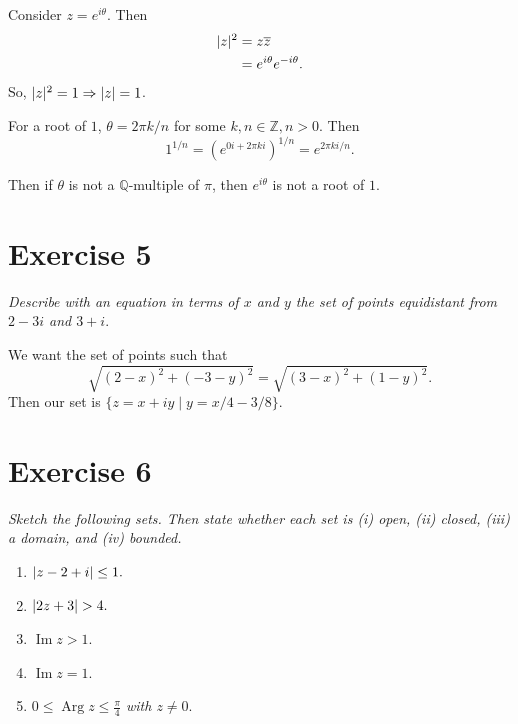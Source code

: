 \documentclass{tufte-handout}
\DeclarePairedDelimiter\abs{\lvert}{\rvert}%
\renewcommand\Im{\operatorname{Im}}
\newcommand\Arg{\operatorname{Arg}}
\begin{document}
\bigskip

Consider $z = e^{i \theta}$. Then
\begin{align*}
  \abs{z}^2 &= z \overline{z}\\
            &= e^{i \theta} e^{-i \theta}.
\end{align*}
So, $\abs{z}^2 = 1 \Rightarrow \abs{z} = 1$.

For a root of $1$, $\theta = 2\pi k / n$ for some $k,n \in \mathbb{Z},
n > 0$. Then
\begin{equation*}
  1^{1/n} = {\left( e^{0i + 2 \pi k i} \right)}^{1/n} = e^{2\pi k i / n}.
\end{equation*}

Then if $\theta$ is not a $\mathbb{Q}$-multiple of $\pi$, then
$e^{i \theta}$ is not a root of $1$.

\section{Exercise 5}

\textit{Describe with an equation in terms of $x$ and $y$ the set of
  points equidistant from $2-3i$ and $3+i.$}

\bigskip

We want the set of points such that
\[
\sqrt{{(2-x)}^2+{(-3-y)}^2} = \sqrt{{(3-x)}^2 + {(1-y)}^2}.
\]
Then our set is $\{z = x + iy \mid y = x/4 - 3/8\}$.

\section{Exercise 6}

\textit{Sketch the following sets. Then state whether each set is (i)
  open, (ii) closed, (iii) a domain, and (iv) bounded.}

\begin{enumerate}[label=\emph{(\alph*)}]
\item \textit{$\abs{z-2+i} \leq 1.$}
\item \textit{$\abs{2z+3} > 4.$}
\item \textit{$\Im{z} > 1.$}
\item \textit{$\Im{z} = 1.$}
\item \textit{$0 \leq \Arg{z} \leq \frac{\pi}{4}$ with $z \neq 0.$}
\end{enumerate}
\end{document}
